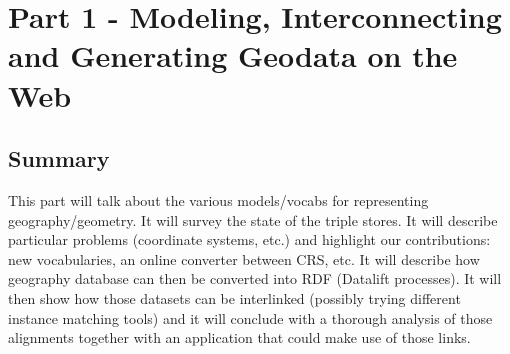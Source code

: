 \chapter*{Part 1 - Modeling, Interconnecting and Generating Geodata on the Web}
\label{part:part1}
 \vspace{10mm}
\section*{Summary}
This part will talk about the various models/vocabs for representing geography/geometry. It will survey the state of the triple stores. It will describe particular problems (coordinate systems, etc.) and highlight our contributions: new vocabularies, an online converter between CRS, etc. It will describe how geography database can then be converted into RDF (Datalift processes). It will then show how those datasets can be interlinked (possibly trying different instance matching tools) and it will conclude with a thorough analysis of those alignments together with an application that could make use of those links.
